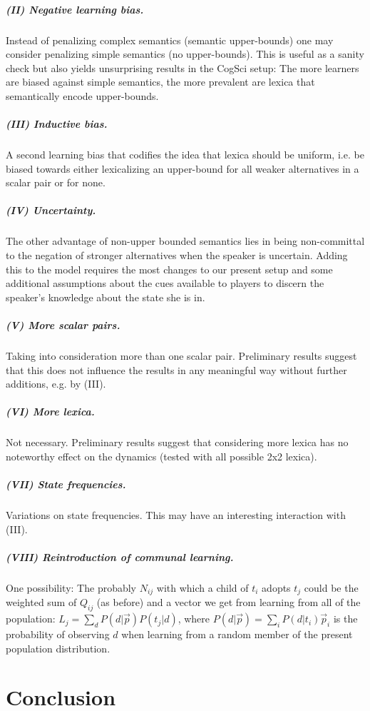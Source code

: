 \documentclass[a4paper]{article}
\begin{document}
\subparagraph{(II) Negative learning bias.} Instead of penalizing complex semantics (semantic upper-bounds) one may consider penalizing simple semantics (no upper-bounds). This is useful as a sanity check but also yields unsurprising results in the CogSci setup: The more learners are biased against simple semantics, the more prevalent are lexica that semantically encode upper-bounds. 

\subparagraph{(III) Inductive bias.} A second learning bias that codifies the idea that lexica should be uniform, i.e. be biased towards either lexicalizing an upper-bound for all weaker alternatives in a scalar pair or for none.

\subparagraph{(IV)  Uncertainty.} The other advantage of non-upper bounded semantics lies in being non-committal to the negation of stronger alternatives when the speaker is uncertain. Adding this to the model requires the most changes to our present setup and some additional assumptions about the cues available to players to discern the speaker's knowledge about the state she is in. 

\subparagraph{(V) More scalar pairs.} Taking into consideration more than one scalar pair. Preliminary results suggest that this does not influence the results in any meaningful way without further additions, e.g. by (III).

\subparagraph{(VI) More lexica.} Not necessary. Preliminary results suggest that considering more lexica has no noteworthy effect on the dynamics (tested with all possible 2x2 lexica).

\subparagraph{(VII) State frequencies.} Variations on state frequencies. This may have an interesting interaction with (III).

\subparagraph{(VIII) Reintroduction of communal learning.} One possibility: The probably $N_{ij}$ with which a child of $t_i$ adopts $t_j$ could be the weighted sum of $Q_{ij}$ (as before) and a vector we get from learning from all of the population: $L_j = \sum_d P(d | \vec{p})  P(t_j | d)$, where $P(d | \vec{p}) = \sum_{i} P(d | t_i)  \vec{p}_i$ is the probability of observing $d$ when learning from a random member of the present population distribution.

\section{Conclusion}


%



\end{document}
